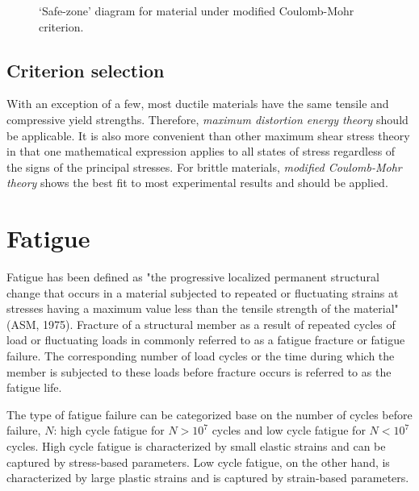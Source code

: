 \documentclass[a4paper,openany,12pt]{book}
\begin{document}
\begin{figure}[h]
  \centering
  \caption{`Safe-zone' diagram for material under modified Coulomb-Mohr criterion.}
  \label{fig: MCM safe zone}
\end{figure}

\subsection{Criterion selection}
\label{criterion-selection}
With an exception of a few, most ductile materials have the same tensile
and compressive yield strengths. Therefore, \emph{maximum distortion energy
theory} should be applicable. It is also more convenient than other
maximum shear stress theory in that one mathematical expression applies
to all states of stress regardless of the signs of the principal
stresses. For brittle materials, \emph{modified Coulomb-Mohr theory} shows
the best fit to most experimental results and should be applied.

\section{Fatigue}
\label{fatigue}
Fatigue has been defined as "the progressive localized permanent
structural change that occurs in a material subjected to repeated or
fluctuating strains at stresses having a maximum value less than the
tensile strength of the material" (ASM, 1975). Fracture of a structural
member as a result of repeated cycles of load or fluctuating loads in
commonly referred to as a fatigue fracture or fatigue failure. The
corresponding number of load cycles or the time during which the member
is subjected to these loads before fracture occurs is referred to as the
fatigue life.

The type of fatigue failure can be categorized base on the number of
cycles before failure, \(N\): high cycle fatigue for \(N > 10^7\) cycles and
low cycle fatigue for \(N < 10^7\) cycles. High cycle fatigue is
characterized by small elastic strains and can be captured by
stress-based parameters. Low cycle fatigue, on the other hand, is
characterized by large plastic strains and is captured by strain-based
parameters.
\end{document}

